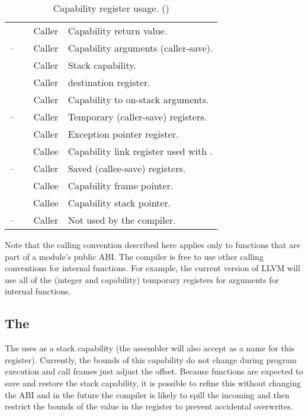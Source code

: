 \begin{table}
\begin{center}
\begin{tabu}{lccX}
			             &                     & Caller & Capability return value. \\
			--  &                     & Caller & Capability arguments (caller-save). \\
			            &            & Caller & Stack capability. \\
			            &                     & Caller &  destination register. \\
			            &                     & Caller & Capability to on-stack arguments. \\
			-- &                     & Caller & Temporary (caller-save) registers.\\
			            &                     & Caller & Exception pointer register. \\
			            &            & Callee & Capability link register used with .\\
			-- &                     & Caller & Saved (callee-save) registers. \\
			            &            & Callee & Capability frame pointer.\\
			            &            & Callee & Capability stack pointer.\\
			-- &                     & Caller & Not used by the compiler.\\
			\bottomrule
		\end{tabu}
		\caption{\label{tbl:purecapreguse}Capability register usage. (\sandboxABI)}
	\end{center}
\end{table}



Note that the calling convention described here applies only to functions that are part of a module's public ABI.
The compiler is free to use other calling conventions for internal functions.
For example, the current version of LLVM will use all of the (integer and
capability) temporary registers for arguments for internal functions.

\subsection{The \sandboxABI{}}

The \sandboxABI{} uses  as a stack capability (the assembler will also accept  as a name for this register).
Currently, the bounds of this capability do not change during program execution and call frames just adjust the offset.
Because functions are expected to save and restore the stack capability, it is possible to refine this without changing the ABI and in the future the compiler is likely to spill the incoming  and then restrict the bounds of the value in the register to prevent accidental overwrites.

